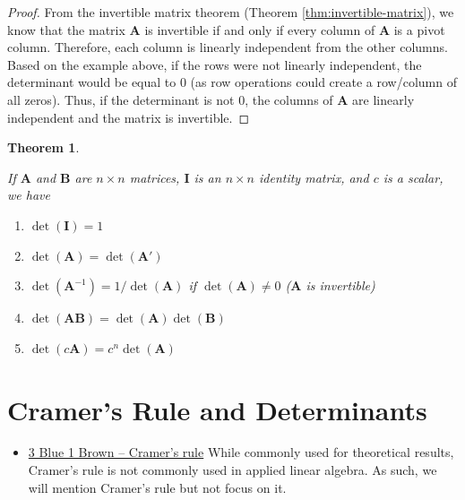 \documentclass[
]{book}
\providecommand{\tightlist}{%
  \setlength{\itemsep}{0pt}\setlength{\parskip}{0pt}}
\newtheorem{theorem}{Theorem}[chapter]
\theoremstyle{definition}
\theoremstyle{definition}
\theoremstyle{definition}
\theoremstyle{remark}
\begin{document}
\begin{proof}

From the invertible matrix theorem (Theorem \ref{thm:invertible-matrix}), we know that the matrix \(\mathbf{A}\) is invertible if and only if every column of \(\mathbf{A}\) is a pivot column. Therefore, each column is linearly independent from the other columns. Based on the example above, if the rows were not linearly independent, the determinant would be equal to 0 (as row operations could create a row/column of all zeros). Thus, if the determinant is not 0, the columns of \(\mathbf{A}\) are linearly independent and the matrix is invertible.

\end{proof}

\begin{theorem}
\protect\hypertarget{thm:unlabeled-div-108}{}\label{thm:unlabeled-div-108}

If \(\mathbf{A}\) and \(\mathbf{B}\) are \(n \times n\) matrices, \(\mathbf{I}\) is an \(n \times n\) identity matrix, and \(c\) is a scalar, we have

\begin{enumerate}
\def\labelenumi{\alph{enumi})}
\item
  \(\det(\mathbf{I}) = 1\)
\item
  \(\det(\mathbf{A}) = \det(\mathbf{A}')\)
\item
  \(\det(\mathbf{A}^{-1}) = 1 / \det(\mathbf{A})\) if \(\det(\mathbf{A}) \neq 0\) (\(\mathbf{A}\) is invertible)
\item
  \(\det(\mathbf{A}\mathbf{B}) = \det(\mathbf{A})\det(\mathbf{B})\)
\item
  \(\det(c\mathbf{A}) = c^n \det(\mathbf{A})\)
\end{enumerate}

\end{theorem}

\hypertarget{cramers-rule-and-determinants}{%
\section{Cramer's Rule and Determinants}\label{cramers-rule-and-determinants}}

\begin{itemize}
\tightlist
\item
  \href{https://www.3blue1brown.com/lessons/cramers-rule}{3 Blue 1 Brown -- Cramer's rule}
  While commonly used for theoretical results, Cramer's rule is not commonly used in applied linear algebra. As such, we will mention Cramer's rule but not focus on it.
\end{itemize}
\end{document}
